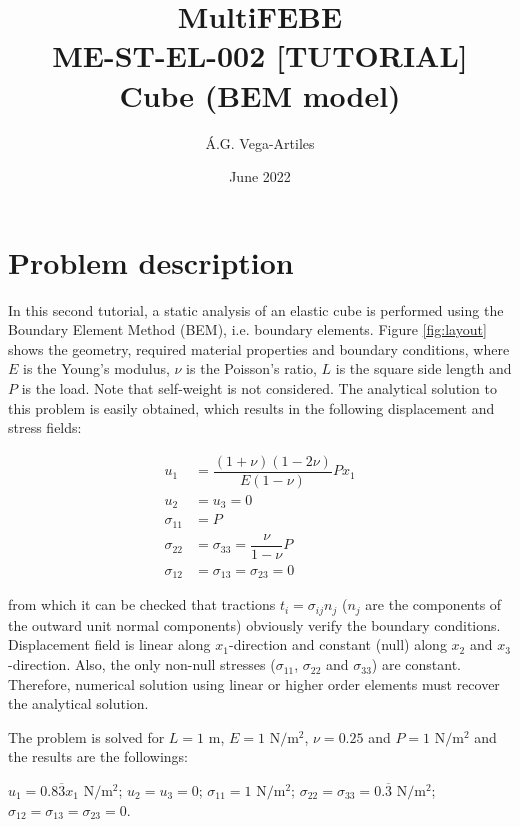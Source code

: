 \documentclass[a4]{article}
\title{MultiFEBE \\ ME-ST-EL-002 [TUTORIAL] \\ Cube (BEM model)}
\author{\'A.G. Vega-Artiles}
\date{June 2022}
\begin{document}
\maketitle

\tableofcontents 

\section{Problem description}

In this second tutorial, a static analysis of an elastic cube is performed using the Boundary Element Method (BEM), i.e. boundary elements. Figure \ref{fig:layout} shows the geometry, required material properties and boundary conditions, where $E$ is the Young's modulus, $\nu$ is the Poisson's ratio, $L$ is the square side length and $P$ is the load. Note that self-weight is not considered. The analytical solution to this problem is easily obtained, which results in the following displacement and stress fields:

\begin{align}
u_1 &= \dfrac{(1+\nu)(1-2\nu)}{E(1-\nu)} P x_1 \\
u_2 &= u_3 = 0 \\
\sigma_{11} &= P \\
\sigma_{22} &= \sigma_{33} = \dfrac{\nu}{1-\nu}P \\
\sigma_{12} &= \sigma_{13} = \sigma_{23}= 0
\end{align}

from which it can be checked that tractions $t_i=\sigma_{ij}n_j$ ($n_j$ are the components of the outward unit normal components) obviously verify the boundary conditions. Displacement field is linear along $x_1$-direction and constant (null) along $x_2$ and $x_3$-direction. Also, the only non-null stresses ($\sigma_{11}$, $\sigma_{22}$ and $\sigma_{33}$) are constant. Therefore, numerical solution using linear or higher order elements must recover the analytical solution.

The problem is solved for $L=1$ $\mathrm{m}$, $E=1$ $\mathrm{N/m^2}$, $\nu=0.25$  and $P=1$ $\mathrm{N/m^2}$ and the results are the followings:

	$u_1 = 0.8\overline{3} x_1$ $\mathrm{N/m^2}$;
	$u_2 = u_3 = 0$;
	$\sigma_{11} = 1$ $\mathrm{N/m^2}$;
	$\sigma_{22} = \sigma_{33} = 0.\overline{3}$ $\mathrm{N/m^2}$;
	$\sigma_{12} = \sigma_{13} = \sigma_{23} = 0$.
\end{document}
